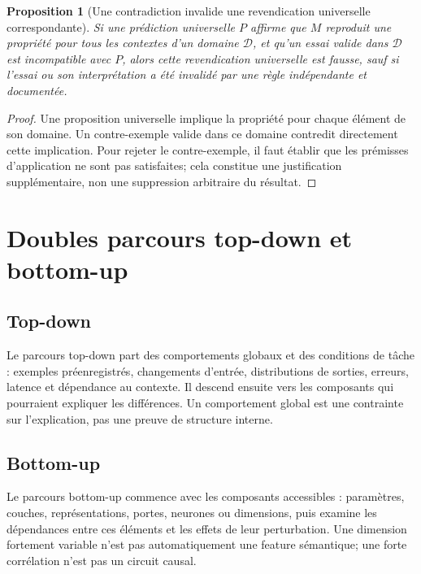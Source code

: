 \documentclass[11pt,oneside]{book}
\newtheorem{proposition}[theoreme]{Proposition}
\theoremstyle{definition}
\theoremstyle{remark}
\newcommand{\1}{\mathbf 1}
\begin{document}
\begin{proposition}[Une contradiction invalide une revendication universelle correspondante]
Si une prédiction universelle $P$ affirme que $M$ reproduit une propriété pour tous les contextes d'un domaine $\mathcal D$, et qu'un essai valide dans $\mathcal D$ est incompatible avec $P$, alors cette revendication universelle est fausse, sauf si l'essai ou son interprétation a été invalidé par une règle indépendante et documentée.
\end{proposition}
\begin{proof}
Une proposition universelle implique la propriété pour chaque élément de son domaine. Un contre-exemple valide dans ce domaine contredit directement cette implication. Pour rejeter le contre-exemple, il faut établir que les prémisses d'application ne sont pas satisfaites; cela constitue une justification supplémentaire, non une suppression arbitraire du résultat.\end{proof}

\chapter{Doubles parcours top-down et bottom-up}
\section{Top-down}
Le parcours top-down part des comportements globaux et des conditions de tâche : exemples préenregistrés, changements d'entrée, distributions de sorties, erreurs, latence et dépendance au contexte. Il descend ensuite vers les composants qui pourraient expliquer les différences. Un comportement global est une contrainte sur l'explication, pas une preuve de structure interne.

\section{Bottom-up}
Le parcours bottom-up commence avec les composants accessibles : paramètres, couches, représentations, portes, neurones ou dimensions, puis examine les dépendances entre ces éléments et les effets de leur perturbation. Une dimension fortement variable n'est pas automatiquement une feature sémantique; une forte corrélation n'est pas un circuit causal.
\end{document}
